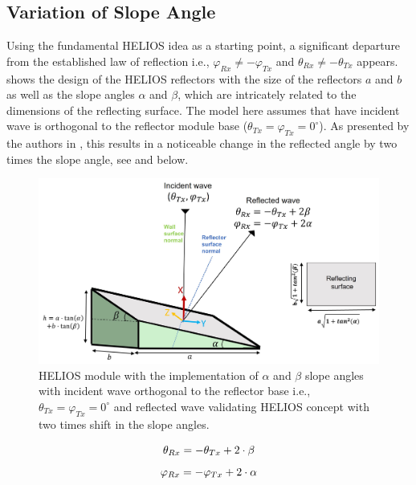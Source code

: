 \subsection{Variation of Slope Angle} \label{Variation of Slope Angle}
Using the fundamental HELIOS idea as a starting point, a significant departure from the established law of reflection i.e., $\varphi_{Rx} \neq -\varphi_{Tx}$ and $\theta_{Rx} \neq -\theta_{Tx}$ appears.  shows the design of the HELIOS reflectors with the size of the reflectors $a$ and $b$ as well as the slope angles $\alpha$ and $\beta$, which are intricately related to the dimensions of the reflecting surface. The model here assumes that have incident wave is orthogonal to the reflector module base ($\theta_{Tx}=\varphi_{Tx}=0^\circ$). As presented by the authors in \cite{Helios}, this results in a noticeable change in the reflected angle by two times the slope angle, see  and  below.
\begin{figure}[tb]
	\centering
	\includegraphics[width=0.7\linewidth]{images/Section 3 Images/HELIOS model}
	\caption{HELIOS module with the implementation of $\alpha$ and $\beta$ slope angles with incident wave orthogonal to the reflector base i.e., $\theta_{Tx}=\varphi_{Tx}=0^\circ$ and reflected wave validating HELIOS concept \cite{Helios} with two times shift in the slope angles.}
	\label{fig:HELIOS-model}
\end{figure}
\begin{equation} \label{HELIOS 2times beta}
	\theta_{Rx}=-\theta_{Tx}+2 \cdot \beta \\
\end{equation}
\begin{equation} \label{HELIOS 2times alpha}
	\varphi_{Rx}=-\varphi_{Tx}+2 \cdot \alpha \\
\end{equation}
